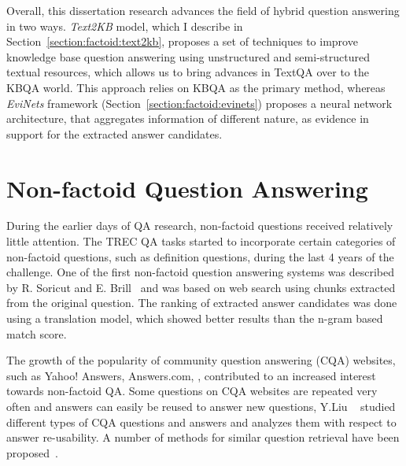 Overall, this dissertation research advances the field of hybrid question answering in two ways.
\textit{Text2KB} model, which I describe in Section~\ref{section:factoid:text2kb}, proposes a set of techniques to improve knowledge base question answering using unstructured and semi-structured textual resources, which allows us to bring advances in TextQA over to the KBQA world.
This approach relies on KBQA as the primary method, whereas \textit{EviNets} framework (Section~\ref{section:factoid:evinets}) proposes a neural network architecture, that aggregates information of different nature, as evidence in support for the extracted answer candidates.

\section{Non-factoid Question Answering}
\label{section:relatedwork:non-factoid}

During the earlier days of QA research, non-factoid questions received relatively little attention.
The TREC QA tasks started to incorporate certain categories of non-factoid questions, such as definition questions, during the last 4 years of the challenge.
One of the first non-factoid question answering systems was described by R. Soricut and E. Brill~\cite{soricut2006automatic} and was based on web search using chunks extracted from the original question.
The ranking of extracted answer candidates was done using a translation model, which showed better results than the n-gram based match score.

The growth of the popularity of community question answering (CQA) websites, such as Yahoo! Answers, Answers.com, \etc, contributed to an increased interest towards non-factoid QA.
Some questions on CQA websites are repeated very often and answers can easily be reused to answer new questions, Y.Liu \etal~\cite{Liu:2008:USA:1599081.1599144} studied different types of CQA questions and answers and analyzes them with respect to answer re-usability.
A number of methods for similar question retrieval have been proposed~\cite{bernhard2009combining,duan2008searching,Jeon:2005:FSQ:1099554.1099572,Shtok:2012:LPA:2187836.2187939}.

